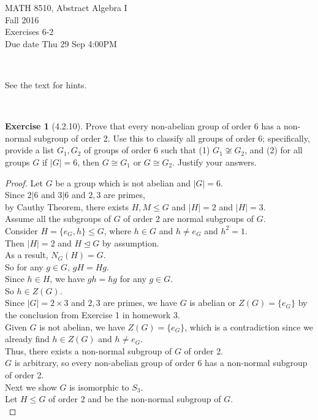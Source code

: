 \documentclass{amsart}
\theoremstyle{plain}
\theoremstyle{definition}
\newtheorem{exer}[lem]{Exercise}
\begin{document}
\noindent MATH 8510, Abstract Algebra I \\
Fall 2016\\
Exercises 6-2\\
Due date Thu 29 Sep 4:00PM

\

\noindent
See the text for hints.

\

%
%

\begin{exer}[4.2.10]
Prove that every non-abelian group of order 6 has a non-normal subgroup of order 2.
Use this to classify all groups of order 6;
specifically, provide a list $G_1,G_2$ of groups of order 6 such that (1) $G_1\not\cong G_2$, and (2) for all groups $G$ if $|G|=6$, then $G\cong G_1$ or $G\cong G_2$.
Justify your answers.
\begin{proof}
Let $G$ be a group which is not abelian and $|G| = 6$.\\
Since $2 | 6$ and $3 | 6$ and $2,3$ are primes, \\
by Cauthy Theorem, there exists $H, M \leq G$ and $|H| = 2$ and $|H| = 3$.\\
Assume all the subgroups of $G$ of order 2 are normal subgroups of $G$. \\
Consider $H=\{e_G,h\} \leq G$, where $h \in G$ and $h \neq e_G$ and $h^2 = 1$. \\
Then $|H| = 2$ and $H \unlhd G$ by assumption. \\
As a result, $N_G(H) = G$.\\
So for any $g \in G$, $gH = Hg$.\\
Since $h \in H$, we have $gh = hg$ for any $g \in G$.\\
So $h \in Z(G)$.\\
Since $|G| = 2\times 3$ and $2,3$ are primes, we have $G$ is abelian or $Z(G)= \{e_G\}$ by the conclusion from Exercise 1 in homework 3.\\
Given $G$ is not abelian, we have $Z(G) = \{e_G\}$, which is a contradiction since we already find $h \in Z(G)$ and $h \neq e_G$.\\
Thus, there exists a non-normal subgroup of $G$ of order 2.\\
$G$ is arbitrary, so every non-abelian group of order 6 has a non-normal subgroup of order 2.\\
Next we show $G$ is isomorphic to $S_3$.\\
Let $H \leq G$ of order 2 and be the non-normal subgroup of $G$.\\

\end{proof}
\end{exer}
\end{document}
